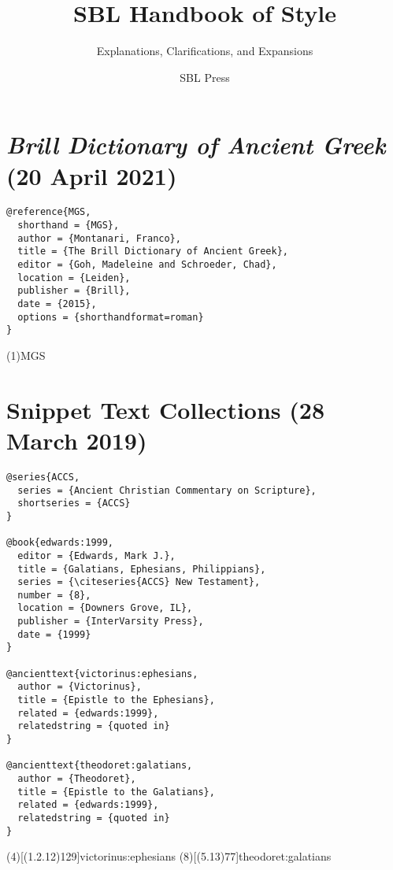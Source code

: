 \documentclass[a4paper]{article}
\begin{document}
\title{SBL Handbook of Style}
\author{Explanations, Clarifications, and Expansions}
\date{SBL Press}
\maketitle

\tableofcontents

\section{\emph{Brill Dictionary of Ancient Greek} (20 April 2021)}

\begin{verbatim}
@reference{MGS,
  shorthand = {MGS},
  author = {Montanari, Franco},
  title = {The Brill Dictionary of Ancient Greek},
  editor = {Goh, Madeleine and Schroeder, Chad},
  location = {Leiden},
  publisher = {Brill},
  date = {2015},
  options = {shorthandformat=roman}
}
\end{verbatim}

\examplecite(1){MGS}
\exampleabbreviations
{}

\section{Snippet Text Collections (28 March 2019)}

\begin{verbatim}
@series{ACCS,
  series = {Ancient Christian Commentary on Scripture},
  shortseries = {ACCS}
}

@book{edwards:1999,
  editor = {Edwards, Mark J.},
  title = {Galatians, Ephesians, Philippians},
  series = {\citeseries{ACCS} New Testament},
  number = {8},
  location = {Downers Grove, IL},
  publisher = {InterVarsity Press},
  date = {1999}
}

@ancienttext{victorinus:ephesians,
  author = {Victorinus},
  title = {Epistle to the Ephesians},
  related = {edwards:1999},
  relatedstring = {quoted in}
}

@ancienttext{theodoret:galatians,
  author = {Theodoret},
  title = {Epistle to the Galatians},
  related = {edwards:1999},
  relatedstring = {quoted in}
}
\end{verbatim}

\examplecite(4)[(1.2.12)129]{victorinus:ephesians}
\examplecite(8)[(5.13)77]{theodoret:galatians}
\nocite{ACCS}
\exampleabbreviations
\examplebibliography
{}
\end{document}
